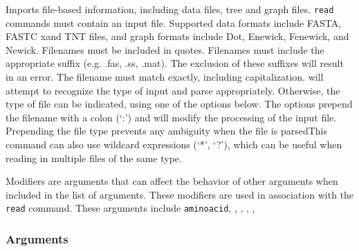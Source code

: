 	\begin{phygdescription}
		{Imports file-based information, including data files, tree and graph files. \texttt{read} 
		commands must contain an input file. Supported data formats include FASTA, FASTC
		xand TNT files, and graph formats include Dot, Enewick, Fenewick, and Newick. 
		Filenames must be included in quotes. Filenames must include the appropriate suffix (e.g. .fas, 
		.ss, .mat). The exclusion of these suffixes will result in an error. The filename must
		match exactly, including capitalization. \phyg will attempt to recognize the type of input
		and parse appropriately. Otherwise, the type of file can be indicated, using one of the 
		options below. The options prepend 	the filename with a colon (`:') and will modify the 
		processing of the input file. Prepending the file type prevents any ambiguity when the 
		file is parsedThis command can also use wildcard expressions (`*', `?'), 
		which can be useful when reading in multiple files of the same type.
		
		Modifiers are arguments that can affect the behavior of other arguments when included
		in the list of arguments. These modifiers are used in association with the \texttt{read}
		command. These arguments include \texttt{aminoacid}, \texttt{}, \texttt{}, \texttt{}, \texttt{}, 	}
	\end{phygdescription}

	\subsubsection{Arguments}
	
